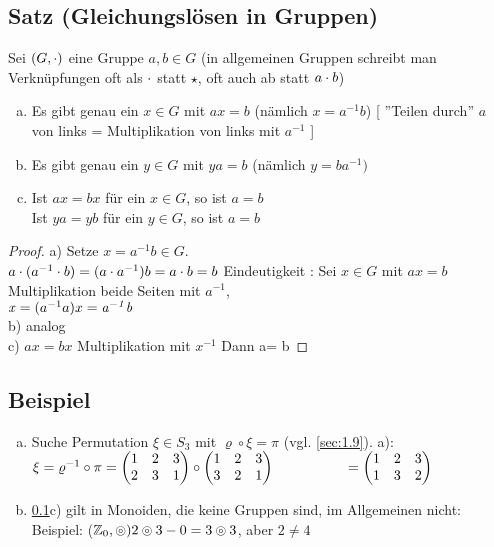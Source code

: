 \subsection{Satz (Gleichungslösen in Gruppen)}\label{sec:1.10}
Sei $(G, \cdot)$ eine Gruppe $a,b \in G$ (in allgemeinen Gruppen schreibt man Verknüpfungen oft als $\cdot$ statt $\star$, oft auch ab statt $a\cdot b$)
\begin{enumerate}[a)]
\item Es gibt genau ein $x \in G$ mit $ax =b$ (nämlich $x = a^{-1}b$)
[ ''Teilen durch'' $a$ von links = Multiplikation von links mit $a^{-1}$ ]
\item Es gibt genau ein $y \in G$ mit $ya = b$ (nämlich $y = ba^{-1})$
\item Ist $ax = bx$ für ein $x \in G$, so ist $a =b$\\
Ist $ya = yb$ für ein $y \in G$, so ist $a =b$
\end{enumerate}
\begin{proof}
a) Setze $x = a^{-1}b \in G$.\\
$a \cdot (a^{-1}\cdot b) = (a \cdot a^{-1}) b = a \cdot b = b$
Eindeutigkeit : Sei $x \in G$ mit $ax = b$\\
Multiplikation beide Seiten mit $a^{-1}$,\\
$\mathit{x} = (a^{-1}a)x = \mathit{a^{-1}b}\\
$\\
b) analog\\
c) $ax =bx$ Multiplikation mit $x^{-1}$ Dann a= b
\end{proof}
\subsection{Beispiel}\label{sec:1.11}
\begin{enumerate}[a)]
\item Suche Permutation $\xi \in S_3$ mit $\varrho \circ \xi = \pi $ (vgl. \ref{sec:1.9}).
a):\\
$\xi = \varrho^{-1} \circ \pi = \begin{pmatrix}
1&2&3\\
2&3&1
\end{pmatrix}\circ \begin{pmatrix}
1&2&3\\
3&2&1
\end{pmatrix}\\
\phantom{\xi = \varrho^{-1} \circ \pi} = \begin{pmatrix}
1&2&3\\
1&3&2
\end{pmatrix}$
\item \ref{sec:1.10}c) gilt in Monoiden, die keine Gruppen sind, im Allgemeinen nicht:\\
Beispiel: ($\mathbb{Z}_0,\circledcirc)\\
2 \circledcirc 3 - 0 = 3 \circledcirc 3$, aber $2\ne 4$
\end{enumerate}
